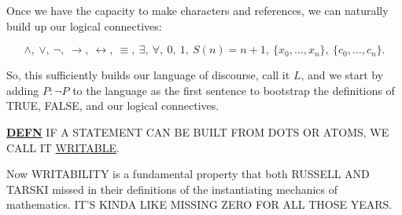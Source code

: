 \documentclass[12pt]{article}
\begin{document}
\begin{example}[htbp]
{%
        }
        \caption{Dots forming the word ``TABLE,'' followed by an arrow
        and a representation of a table.}
        \label{ex:dotted-table}
    \end{example}

    Once we have the capacity to make characters and references, we can naturally
    build up our logical connectives:

    \[
        \wedge,\ \vee,\ \neg,\ \to,\ \leftrightarrow,\ \equiv,\ \exists,\ \forall,
        \ 0,\ 1,\ S(n)=n+1,\ \{x_0,\ldots,x_n\},\ \{c_0,\ldots,c_n\}.
    \]

    So, this sufficiently builds our language of discourse, call it \(L\), and we
    start by adding \(P:\neg P\) to the language as the first sentence to
    bootstrap the definitions of TRUE, FALSE, and our logical connectives.

    \textbf{\underline{DEFN}} IF A STATEMENT CAN BE BUILT FROM DOTS OR ATOMS, WE
    CALL IT \underline{WRITABLE}.

    Now WRITABILITY is a fundamental property that both RUSSELL AND TARSKI missed
    in their definitions of the instantiating mechanics of mathematics. IT'S KINDA
    LIKE MISSING ZERO FOR ALL THOSE YEARS.
\end{document}
